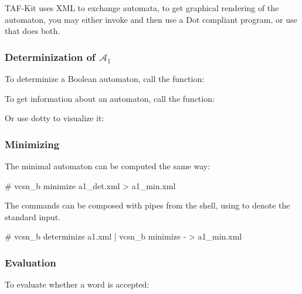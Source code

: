 
TAF-Kit uses XML to exchange automata, to get graphical rendering of
the automaton, you may either invoke  and then
use a Dot compliant program, or use  that does
both.

\begin{center}
\end{center}


\subsubsection{Determinization of $\mathcal{A}_1$}
To determinize a Boolean automaton, call the
 function:


To get information about an automaton, call the  function:

Or use dotty to visualize it:
\begin{center}
\end{center}

\subsubsection{Minimizing}

The minimal automaton can be computed the same way:
\begin{shell}
# vcsn_b minimize a1_det.xml > a1_min.xml
\end{shell}

The commands can be composed with pipes from the shell, using
\Index{\samp{-}} to denote the standard input.
\begin{shell}
# vcsn_b determinize a1.xml | vcsn_b minimize - > a1_min.xml
\end{shell}


\subsubsection{Evaluation}

To evaluate whether a word is accepted:

